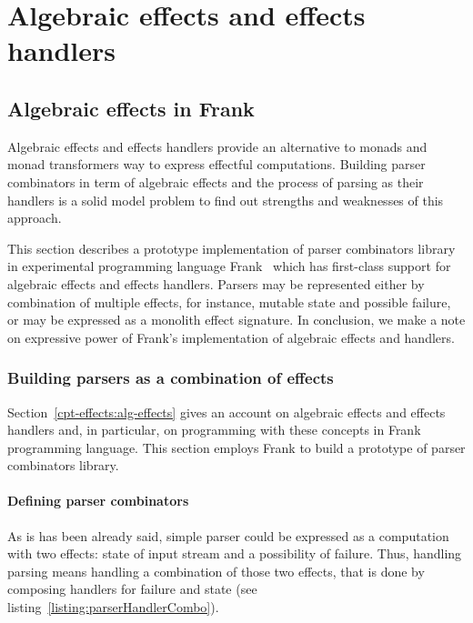\chapter{Algebraic effects and effects handlers}
\label{cpt-parsers}

  \section{Algebraic effects in Frank}
  \label{cpt-parsers:alg-eff}

  Algebraic effects and effects handlers provide an alternative to monads and monad
  transformers way to express effectful computations. Building parser combinators in
  term of algebraic effects and the process of parsing as their handlers is a solid
  model problem to find out strengths and weaknesses of this approach.

  This section describes a prototype implementation of parser
  combinators library in experimental programming language
  Frank~\cite{DBLP:conf/popl/LindleyMM17} which has first-class support for
  algebraic effects and effects handlers. Parsers may be represented either by
  combination of multiple effects, for instance, mutable state and possible failure,
  or may be expressed as a monolith effect signature. In conclusion, we make a
  note on expressive power of Frank's implementation of algebraic effects and
  handlers.

  \subsection{Building parsers as a combination of effects}

    Section~\ref{cpt-effects:alg-effects} gives an account on algebraic effects and
    effects handlers and, in particular, on programming with these concepts in Frank
    programming language. This section employs Frank to build a prototype of parser
    combinators library.

    \subsubsection{Defining parser combinators}

    As is has been already said, simple parser could be expressed as a computation
    with two effects: state of input stream and a possibility of failure. Thus,
    handling parsing means handling a combination of those two effects, that is done
    by composing handlers for failure and state (see
    listing~\ref{listing:parserHandlerCombo}).

